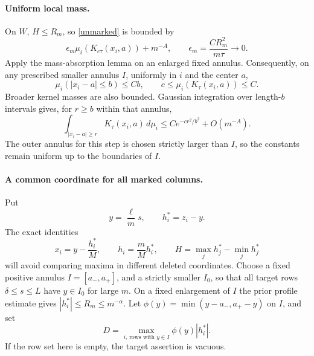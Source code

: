 \documentclass[11pt]{article}
\begin{document}
\paragraph{Uniform local mass.}
On $W$, $H\le R_m$, so \eqref{unmarked} is bounded by
\[
 \epsilon_m\mu_i(K_{c\tau}(x_i,a))+m^{-A},
 \qquad \epsilon_m=\frac{CR_m^2}{m\tau}\longrightarrow0.
\]
Apply the mass-absorption lemma on an enlarged fixed annulus.
Consequently, on any prescribed smaller annulus $I$, uniformly in
$i$ and the center $a$,
\begin{equation}\label{mass}
 \mu_i(|x_i-a|\le b)\le Cb,\qquad
 c\le\mu_i(K_\tau(x_i,a))\le C.
\end{equation}
Broader kernel masses are also bounded. Gaussian integration over
length-$b$ intervals gives, for $r\ge b$ within that annulus,
\begin{equation}\label{tail}
 \int_{|x_i-a|\ge r}K_\tau(x_i,a)\,d\mu_i
       \le C e^{-cr^2/b^2}+O(m^{-A}).
\end{equation}
The outer annulus for this step is chosen strictly larger than $I$,
so the constants remain uniform up to the boundaries of $I$.

\paragraph{A common coordinate for all marked columns.}
Put
\[
 y=\frac\ell m s,\qquad h_i^*=z_i-y.
\]
The exact identities
\begin{equation}\label{conversion}
 x_i=y-\frac{h_i^*}{M},\qquad
 h_i=\frac mM h_i^*,\qquad
 H=\max_j h_j^*-\min_j h_j^*
\end{equation}
will avoid comparing maxima in different deleted coordinates.
Choose a fixed positive annulus $I=[a_-,a_+]$, and a strictly
smaller $I_0$, so that all target rows $\delta\le s\le L$ have
$y\in I_0$ for large $m$. On a fixed enlargement of $I$ the prior
profile estimate gives $|h_i^*|\le R_m\le m^{-\alpha}$.
Let $\phi(y)=\min(y-a_-,a_+-y)$ on $I$, and set
\[
 D=\max_{i,\,\text{rows with }y\in I}\phi(y)|h_i^*|.
\]
If the row set here is empty, the target assertion is vacuous.
\end{document}
